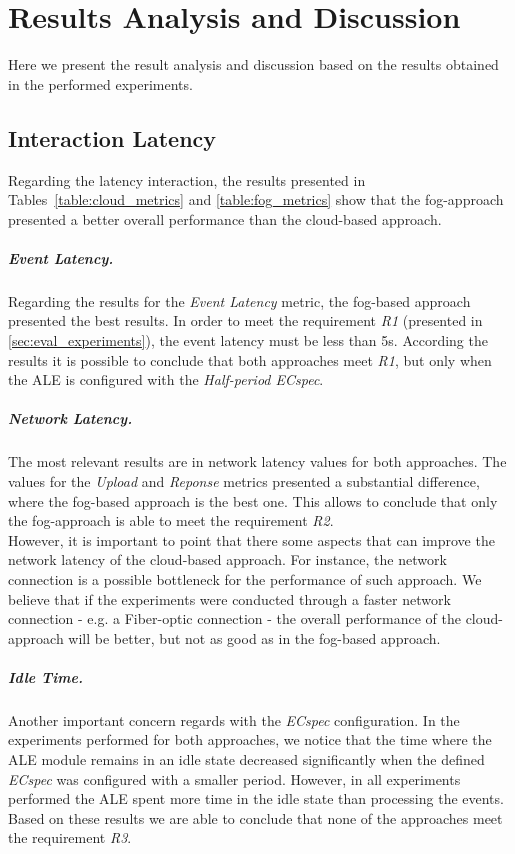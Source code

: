        \section{Results Analysis and Discussion}
        \label{sec:eval_analysis}
        Here we present the result analysis and discussion based on the results obtained in the performed
        experiments.

        \subsection{Interaction Latency}
        \label{subs:eval_results_latency}
        Regarding the latency interaction, the results presented in Tables~\ref{table:cloud_metrics} and
        \ref{table:fog_metrics} show that the fog-approach presented a better overall performance than
        the cloud-based approach.

        \subparagraph{Event Latency.}
        \label{subp:eval_event_latency}
        Regarding the results for the \textit{Event Latency} metric, the fog-based approach presented the
        best results. In order to meet the requirement \textit{R1} (presented in \ref{sec:eval_experiments}),
        the event latency must be less than 5s. According the results it is possible to conclude that both
        approaches meet \textit{R1}, but only when the \gls{ALE} is configured with the \textit{Half-period ECspec}.

        \subparagraph{Network Latency.}
        \label{subp:eval_network_latency}
        The most relevant results are in network latency values for both approaches. The values for the \textit{Upload}
        and \textit{Reponse} metrics presented a substantial difference, where the fog-based approach is the
        best one. This allows to conclude that only the fog-approach is able to meet the requirement \textit{R2}.\\

        However, it is important to point that there some aspects that can improve the network latency
        of the cloud-based approach. For instance, the network connection is a possible bottleneck for the
        performance of such approach. We believe that if the experiments were conducted through a faster
        network connection - e.g. a Fiber-optic connection - the overall performance of the cloud-approach
        will be better, but not as good as in the fog-based approach.

        \subparagraph{Idle Time.}
        \label{subp:eval_idle_time}
        Another important concern regards with the \textit{ECspec} configuration. In the experiments
        performed for both approaches, we notice that the time where the \gls{ALE} module remains in an idle
        state decreased significantly when the defined \textit{ECspec} was configured with a smaller period.
        However, in all experiments performed the \gls{ALE} spent more time in the idle state than
        processing the events. Based on these results we are able to conclude that none of the approaches
        meet the requirement \textit{R3}.

